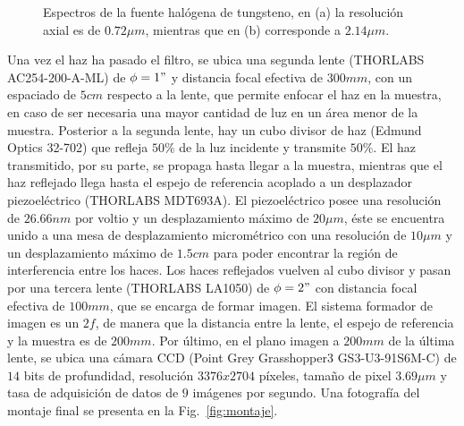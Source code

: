 \begin{figure}[ht!]
	\centering
	\caption[Espectro de la fuente empleada]{Espectros de la fuente halógena de tungsteno, en (a) la resolución axial es de $0.72\mu m$, mientras que en (b) corresponde a $2.14\mu m$.}
	\label{fig:spectrums}
\end{figure}

Una vez el haz ha pasado el filtro, se ubica una segunda lente (THORLABS AC254-200-A-ML) de $\phi=1"$ y distancia focal efectiva de $300mm$, con un espaciado de $5cm$ respecto a la lente, que permite enfocar el haz en la muestra, en caso de ser necesaria una mayor cantidad de luz en un área menor de la muestra. Posterior a la segunda lente, hay un cubo divisor de haz (Edmund Optics 32-702) que refleja $50\% $ de la luz incidente y transmite $50\%$. El haz transmitido, por su parte, se propaga hasta llegar a la muestra, mientras que el haz reflejado llega hasta el espejo de referencia acoplado a un desplazador piezoeléctrico (THORLABS MDT693A). El piezoeléctrico posee una resolución de $26.66nm$ por voltio y un desplazamiento máximo de $20\mu m$, éste se encuentra unido a una mesa de desplazamiento micrométrico con una resolución de $10\mu m$ y un desplazamiento máximo de $1.5cm$ para poder encontrar la región de interferencia entre los haces. Los haces reflejados vuelven al cubo divisor y pasan por una tercera lente (THORLABS LA1050) de $\phi=2"$ con distancia focal efectiva de $100mm$, que se encarga de formar imagen. El sistema formador de imagen es un $2f$, de manera que la distancia entre la lente, el espejo de referencia y la muestra es de $200mm$. Por último, en el plano imagen a $200mm$ de la última lente, se ubica una cámara CCD (Point Grey Grasshopper3 GS3-U3-91S6M-C) de $14$ bits de profundidad, resolución $3376x2704$ píxeles, tamaño de pixel $3.69\mu m$ y tasa de adquisición de datos de $9$ imágenes por segundo. Una fotografía del montaje final se presenta en la Fig.~\ref{fig:montaje}.

